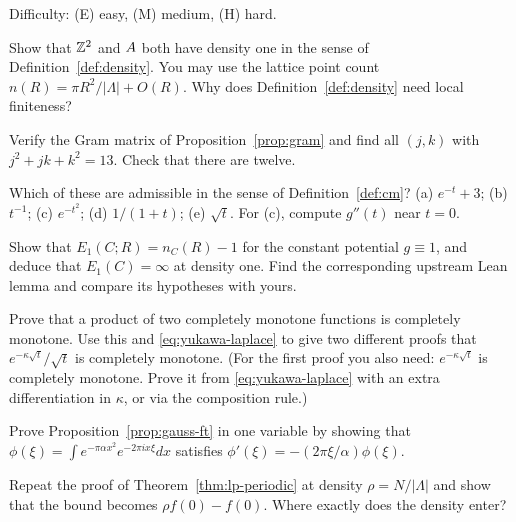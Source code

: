 Difficulty: (E) easy, (M) medium, (H) hard.

\begin{exercise}[(E)]
Show that $\mathbb{Z}^2$ and $A$ both have density one in the sense of Definition~\ref{def:density}. You may use the lattice
point count $n(R)=\pi R^2/|\Lambda|+O(R)$. Why does Definition~\ref{def:density} need local finiteness?
\end{exercise}

\begin{exercise}[(E)]
Verify the Gram matrix of Proposition~\ref{prop:gram} and find all $(j,k)$ with $j^2+jk+k^2=13$. Check that there are
twelve.
\end{exercise}

\begin{exercise}[(E)]
Which of these are admissible in the sense of Definition~\ref{def:cm}? (a) $e^{-t}+3$; (b) $t^{-1}$; (c) $e^{-t^2}$;
(d) $1/(1+t)$; (e) $\sqrt t$. For (c), compute $g''(t)$ near $t=0$.
\end{exercise}

\begin{exercise}[(E)]
Show that $E_1(C;R)=n_C(R)-1$ for the constant potential $g\equiv1$, and deduce that $E_1(C)=\infty$ at density one.
Find the corresponding upstream Lean lemma and compare its hypotheses with yours.
\end{exercise}

\begin{exercise}[(M)]
Prove that a product of two completely monotone functions is completely monotone. Use this and
\eqref{eq:yukawa-laplace} to give two different proofs that $e^{-\kappa\sqrt t}/\sqrt t$ is completely monotone. (For
the first proof you also need: $e^{-\kappa\sqrt t}$ is completely monotone. Prove it from
\eqref{eq:yukawa-laplace} with an extra differentiation in $\kappa$, or via the composition rule.)
\end{exercise}

\begin{exercise}[(M)]
Prove Proposition~\ref{prop:gauss-ft} in one variable by showing that $\phi(\xi)=\int e^{-\pi\alpha x^2}e^{-2\pi ix\xi}dx$
satisfies $\phi'(\xi)=-(2\pi\xi/\alpha)\phi(\xi)$.
\end{exercise}

\begin{exercise}[(M)]
Repeat the proof of Theorem~\ref{thm:lp-periodic} at density $\rho=N/|\Lambda|$ and show that the bound becomes
$\rho\widehat f(0)-f(0)$. Where exactly does the density enter?
\end{exercise}

